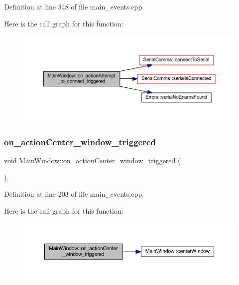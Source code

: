 Definition at line 348 of file main\+\_\+events.\+cpp.

Here is the call graph for this function\+:
\nopagebreak
\begin{figure}[H]
\begin{center}
\leavevmode
\includegraphics[width=350pt]{class_main_window_aea8024d64cc8d8b805b66a45524e753e_cgraph}
\end{center}
\end{figure}
\mbox{\label{class_main_window_a6ced641b27821f153cd80aef4719fe41}} 
\subsubsection{\texorpdfstring{on\_actionCenter\_window\_triggered}{on\_actionCenter\_window\_triggered}}
{\footnotesize\ttfamily void Main\+Window\+::on\+\_\+action\+Center\+\_\+window\+\_\+triggered (\begin{DoxyParamCaption}{ }\end{DoxyParamCaption})\hspace{0.3cm}{\ttfamily [private]}, {\ttfamily [slot]}}



Definition at line 203 of file main\+\_\+events.\+cpp.

Here is the call graph for this function\+:
\nopagebreak
\begin{figure}[H]
\begin{center}
\leavevmode
\includegraphics[width=350pt]{class_main_window_a6ced641b27821f153cd80aef4719fe41_cgraph}
\end{center}
\end{figure}
\mbox{\label{class_main_window_aa6925b9f63240473ebb0baeb0caf51d5}} 
